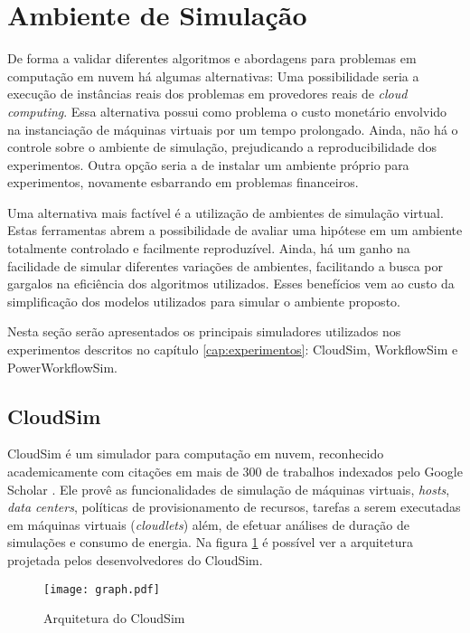 \section{Ambiente de Simulação}
\label{sec:ambiente_simulacao}
De forma a validar diferentes algoritmos e abordagens para problemas em computação
em nuvem há algumas alternativas: Uma possibilidade seria a execução de instâncias
reais dos problemas em provedores reais de \emph{cloud computing}. Essa alternativa
possui como problema o custo monetário envolvido na instanciação de máquinas
virtuais por um tempo prolongado. Ainda, não há o controle sobre o ambiente 
de simulação, prejudicando a reproducibilidade dos experimentos. Outra opção
seria a de instalar um ambiente próprio para experimentos, novamente esbarrando
em problemas financeiros. 

Uma alternativa mais factível é a utilização de ambientes de simulação virtual.
Estas ferramentas abrem a possibilidade de avaliar uma hipótese em um ambiente
totalmente controlado e facilmente reproduzível. Ainda, há um ganho na facilidade
de simular diferentes variações de ambientes, facilitando a busca por gargalos
na eficiência dos algoritmos utilizados. Esses benefícios vem ao custo da
simplificação dos modelos utilizados para simular o ambiente proposto.

Nesta seção serão apresentados os principais simuladores utilizados nos 
experimentos descritos no capítulo \ref{cap:experimentos}: CloudSim, WorkflowSim
e PowerWorkflowSim.

\subsection{CloudSim}
CloudSim \cite{calheiros:cloudsim} é um simulador para computação em nuvem,
reconhecido academicamente com citações em mais de 300 de trabalhos indexados
pelo Google Scholar \cite{google:cloudsim}. Ele provê as funcionalidades
de simulação de máquinas virtuais, \emph{hosts}, \emph{data centers}, políticas
de provisionamento de recursos, tarefas a serem executadas em máquinas virtuais
(\emph{cloudlets}) além, de efetuar análises de duração de simulações e consumo
de energia. Na figura \ref{fig:arquitetura_cloudsim} é possível ver a arquitetura projetada
pelos desenvolvedores do CloudSim. 

\begin{figure}[ht]
\centering
\texttt{[image: graph.pdf]}
\caption{Arquitetura do CloudSim}
\label{fig:arquitetura_cloudsim}
\end{figure}

